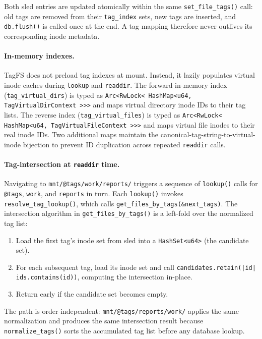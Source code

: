 \documentclass[5p,times]{elsarticle}
\begin{document}
Both sled entries are updated atomically within the same
\texttt{set\_file\_tags()} call: old tags are removed from their
\texttt{tag\_index} sets, new tags are inserted, and \texttt{db.flush()}
is called once at the end.  A tag mapping therefore never outlives its
corresponding inode metadata.

\paragraph{In-memory indexes.}
TagFS does not preload tag indexes at mount.  Instead, it lazily
populates virtual inode caches during \texttt{lookup} and
\texttt{readdir}. The forward in-memory index (\texttt{tag\_virtual\_dirs})
is typed as \texttt{Arc\textless{}\allowbreak{}RwLock\textless{}\allowbreak{}%
HashMap\textless{}u64,\,\allowbreak{}TagVirtualDirContext%
\textgreater{}\textgreater{}\textgreater{}}
and maps virtual directory inode IDs to their tag lists.  The reverse
index (\texttt{tag\_virtual\_files}) is typed as
\texttt{Arc\textless{}\allowbreak{}RwLock\textless{}\allowbreak{}%
HashMap\textless{}u64,\,\allowbreak{}TagVirtualFileContext%
\textgreater{}\textgreater{}\textgreater{}}
and maps virtual file inodes to their real inode IDs.
Two additional maps maintain the canonical-tag-string-to-virtual-inode
bijection to prevent ID duplication across repeated \texttt{readdir} calls.

\paragraph{Tag-intersection at \texttt{readdir} time.}
Navigating to \texttt{mnt/@tags/work/reports/} triggers a sequence of
\texttt{lookup()} calls for \texttt{@tags}, \texttt{work}, and
\texttt{reports} in turn.  Each \texttt{lookup()} invokes
\texttt{resolve\_tag\_lookup()}, which calls
\texttt{get\_files\_by\_tags(\&next\_tags)}.  The intersection algorithm
in \texttt{get\_files\_by\_tags()} is a left-fold over the normalized
tag list:
\begin{enumerate}
\item Load the first tag's inode set from sled into a
  \texttt{HashSet\textless{}u64\textgreater{}} (the candidate set).
\item For each subsequent tag, load its inode set and call
  \texttt{candidates.retain(|id| ids.contains(id))}, computing the
  intersection in-place.
\item Return early if the candidate set becomes empty.
\end{enumerate}
The path is order-independent: \texttt{mnt/@tags/reports/work/}
applies the same normalization and produces the same intersection result
because \texttt{normalize\_tags()} sorts the accumulated tag list before
any database lookup.
\end{document}
